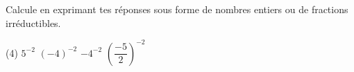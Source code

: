 %
%
    Calcule en exprimant tes réponses sous forme de nombres entiers ou de fractions irréductibles.
    \begin{tasks}(4)
        \task \(5^{-2}\)
        \task \(\left(-4\right)^{-2}\)
        \task \(- 4^{- 2}\)
        \task \(\left( \dfrac{- 5}{2} \right)^{- 2}\)
    \end{tasks}
